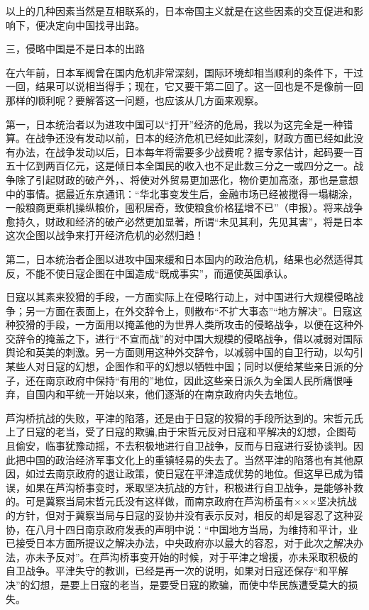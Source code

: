 以上的几种因素当然是互相联系的，日本帝国主义就是在这些因素的交互促进和影响下，便决定向中国找寻出路。

三，侵略中国是不是日本的出路

在六年前，日本军阀曾在国内危机非常深刻，国际环境却相当顺利的条件下，干过一回，结果可以说相当得手；现在，它又要干第二回了。这一回也是不是像前一回那样的顺利呢？要解答这一问题，也应该从几方面来观察。

第一，日本统治者以为进攻中国可以“打开”经济的危局，我以为这完全是一种错算。在战争还没有发动以前，日本的经济危机已经如此深刻，财政方面已经如此没有办法，在战争发动以后，日本每年将需要多少战费呢？据专家估计，起码要一百五十亿到两百亿元，这是倾日本全国民的收入也不足此数三分之一或四分之一。战争除了引起财政的破产外，、将使对外贸易更加恶化，物价更加高涨，那也是意想中的事情。据最近东京通讯：“华北事变发生后，金融市场已经被搅得一塌糊涂，一般粮商更乘机操纵粮价，囤积居奇，致使粮食价格猛增不已”（申报）。将来战争愈持久，财政和经济的破产必然更加显著，所谓“未见其利，先见其害”，将是日本这次企图以战争来打开经济危机的必然归趋！

第二，日本统治者企图以进攻中国来缓和日本国内的政治危机，结果也必然适得其反，不能不使日寇企图在中国造成“既成事实”，而逼使英国承认。

日寇以其素来狡猾的手段，一方面实际上在侵略行动上，对中国进行大规模侵略战争；另一方面在表面上，在外交辞令上，则散布“不扩大事态”“地方解决”。日寇这种狡猾的手段，一方面用以掩盖他的为世界人类所攻击的侵略战争，以便在这种外交辞令的掩盖之下，进行“不宣而战”的对中国大规模的侵略战争，借以减弱对国际舆论和英美的刺激。另一方面则用这种外交辞令，以减弱中国的自卫行动，以勾引某些人对日寇的幻想，企图作和平的幻想以牺牲中国；同时以便给某些亲日派的分子，还在南京政府中保持“有用的”地位，因此这些亲日派久为全国人民所痛恨唾弃，自国内和平统一开始以来，他们逐渐的在南京政府内失去地位。

芦沟桥抗战的失败，平津的陷落，还是由于日寇的狡猾的手段所达到的。宋哲元氏上了日寇的老当，受了日寇的欺骗,由于宋哲元反对日寇和平解决的幻想，企图苟且偷安，临事犹豫动摇，不去积极地进行自卫战争，反而与日寇进行妥协谈判。因此把中国的政治经济军事文化上的重镇轻易的失去了。当然平津的陷落也有其他原因，如过去南京政府的退让政策，使日寇在平津造成优势的地位。但这早已成为错误，如果在芦沟桥事变时，釆取坚决抗战的方针，积极进行自卫战争，是能够补救的。可是冀察当局宋哲元氏没有这样做，而南京政府在芦沟桥虽有×××坚决抗战的方针，但对于冀察当局与日寇的妥协并没有表示反对，相反的却是容忍了这种妥协，在八月十四日南京政府发表的声明中说：“中国地方当局，为维持和平计，业已接受日本方面所提议之解决办法，中央政府亦以最大的容忍，对于此次之解决办法，亦未予反对”。在芦沟桥事变开始的时候，对于平津之增援，亦未采取积极的自卫战争。平津失守的教训，已经是再一次的说明，如果对日寇还保存“和平解决”的幻想，是要上日寇的老当，是要受日寇的欺骗，而使中华民族遭受莫大的损失。

